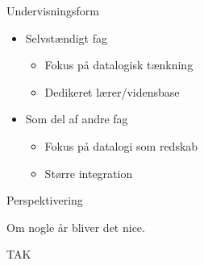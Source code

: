 \documentclass{beamer}
\begin{document}
\begin{frame}{Undervisningsform}
\begin{itemize}
\item Selvstændigt fag
\begin{itemize}
\item Fokus på datalogisk tænkning
\item Dedikeret lærer/vidensbase
\end{itemize}
\item Som del af andre fag
\begin{itemize}
\item Fokus på datalogi som redskab
\item Større integration
\end{itemize}
\end{itemize}
\end{frame}

\begin{frame}{Perspektivering}

Om nogle år bliver det nice.

\end{frame}

\begin{frame}{TAK}

\end{frame}
\end{document}
